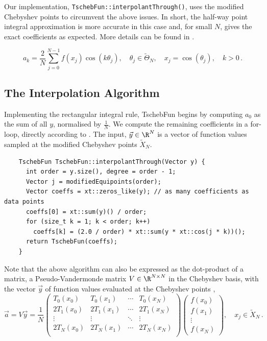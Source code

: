 \documentclass[12pt, a4paper]{article}
\newcommand{\chebyshev}{Chebyshev\xspace}
\newcommand{\tschebfun}{\textcolor{themecolor3}{TschebFun}\xspace}
\begin{document}
  Our implementation, \texttt{\tschebfun::\textcolor{themecolor2}{interpolantThrough}()}, uses the modified Chebyshev points to circumvent the above issues.
  In short, the half-way point integral approximation is more accurate in this case and, for small $N$, gives the exact coefficients as expected.
  More details can be found in \cite{CombTrig}.

  \begin{equation}
    a_k = \frac{2}{N} \sum_{j=0}^{N-1} f(x_j) \cos(k \theta_j), \quad \theta_j \in \tilde{\Theta}_N, \quad x_j = \cos(\theta_j), \quad k > 0 \,.
    \label{eq:coefficient-formula}
  \end{equation}

  \subsection{The Interpolation Algorithm}
  Implementing the rectangular integral rule, \tschebfun begins by computing $a_0$ as the sum of all $y$, normalised by $\frac{1}{N}$.
  We compute the remaining coefficients in a for-loop, directly according to .
  The input, $\vec{y} \in \R^N$ is a vector of function values sampled at the modified \chebyshev points $\tilde{X}_N$.
  \begin{verbatim}
    TschebFun TschebFun::interpolantThrough(Vector y) {
      int order = y.size(), degree = order - 1;
      Vector j = modifiedEquipoints(order);
      Vector coeffs = xt::zeros_like(y); // as many coefficients as data points
      coeffs[0] = xt::sum(y)() / order;
      for (size_t k = 1; k < order; k++)
        coeffs[k] = (2.0 / order) * xt::sum(y * xt::cos(j * k))();
      return TschebFun(coeffs);
    }
  \end{verbatim}

  Note that the above algorithm can also be expressed as the dot-product of a matrix, a Pseudo-Vandermonde matrix $V \in \R^{N\times N}$ in the \chebyshev basis, with the vector $\vec{y}$ of function values evaluated at the Chebyshev points \parencite{numpy},
  $$\vec{a} = V \vec{y} = \frac{1}{N} \begin{pmatrix}
      T_0(x_0)  & T_0(x_1)  & \cdots & T_0(x_N)  \\
      2T_1(x_0) & 2T_1(x_1) & \cdots & 2T_1(x_N) \\
      \vdots    & \vdots    & \ddots & \vdots    \\
      2T_N(x_0) & 2T_N(x_1) & \cdots & 2T_N(x_N) \\
    \end{pmatrix} \begin{pmatrix}
      f(x_0) \\
      f(x_1) \\
      \vdots \\
      f(x_N)
    \end{pmatrix}, \quad x_j \in \tilde{X}_N \,.$$
\end{document}
